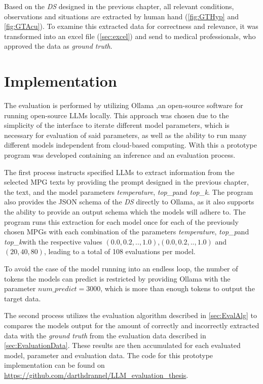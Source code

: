 \documentclass[bs, english]{stthesis}
\newcommand{\temperature}{{\textit{temperature}}}
\newcommand{\topP}{{\textit{top\_p}}}
\newcommand{\topK}{{\textit{top\_k}}}
\begin{document}
Based on the \textit{DS} designed in the previous chapter, all relevant conditions, observations and situations are extracted by human hand (\cref{fig:GTHyp} and \cref{fig:GTAcu}). To examine this extracted data for correctness and relevance, it was transformed into an excel file (\cref{sec:excel}) and send to medical professionals, who approved the data as \textit{ground truth}.

\section{Implementation}

The evaluation is performed by utilizing Ollama \cite{Ollama},an open-source software for running open-source LLMs locally. This approach was chosen due to the simplicity of the interface to iterate different model parameters, which is necessary for evaluation of said parameters, as well as the ability to run many different models independent from cloud-based computing. With this a prototype program was developed containing an inference and an evaluation process.

The first process instructs specified LLMs to extract information from the selected MPG texts by providing the prompt designed in the previous chapter, the text, and the model parameters \temperature, \topP and \topK. The program also provides the JSON schema of the \textit{DS} directly to Ollama, as it also supports the ability to provide an output schema which the models will adhere to.
The program runs this extraction for each model once for each of the previously chosen MPGs with each combination of the parameters \temperature, \topP and \topK with the respective values $(0.0, 0.2, .., 1.0)$,$(0.0, 0.2, .., 1.0)$ and $(20,40,80)$, leading to a total of 108 evaluations per model.

To avoid the case of the model running into an endless loop, the number of tokens the models can predict is restricted by providing Ollama with the parameter $num\_predict = 3000$, which is more than enough tokens to output the target data.

The second process utilizes the evaluation algorithm described in \cref{sec:EvalAlg} to compares the models output for the amount of correctly and incorrectly extracted data with the \textit{ground truth} from the evaluation data described in \cref{sec:EvaluationData}. These results are then accumulated for each evaluated model, parameter and evaluation data. The code for this prototype implementation can be found on \url{https://github.com/darthdrannel/LLM_evaluation_thesis}.
\end{document}

